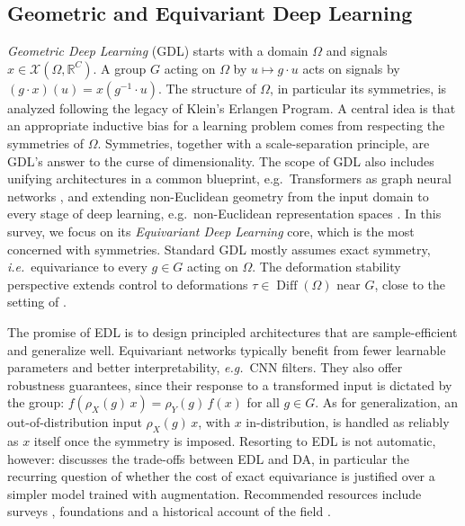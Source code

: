 \documentclass[mathematics,review,submit,moreauthors]{Definitions/mdpi}
\begin{document}
\subsection{Geometric and Equivariant Deep Learning}\label{sec:gdl}
\emph{Geometric Deep Learning} (GDL) \citep{bronstein2017ispm,bronstein2021} starts with a domain $\Omega$ and signals $x\in\mathcal{X}(\Omega,\mathbb{R}^C)$. A group $G$ acting on $\Omega$ by $u\mapsto g\cdot u$ acts on signals by $(g\cdot x)(u)=x(g^{-1}\cdot u)$.
The structure of $\Omega$, in particular its symmetries, is analyzed following the legacy of Klein's Erlangen Program.
A central idea is that an appropriate inductive bias for a learning problem comes from respecting the symmetries of $\Omega$.
Symmetries, together with a scale-separation principle, are GDL's answer to the curse of dimensionality.
The scope of GDL also includes unifying architectures in a common blueprint, e.g.\ Transformers as graph neural networks \citep{joshi2025}, and extending non-Euclidean geometry from the input domain to every stage of deep learning, e.g.\ non-Euclidean representation spaces \citep{mettes2024ijcv,saezdeocarizborde2025iclr}.
In this survey, we focus on its \emph{Equivariant Deep Learning} core, which is the most concerned with symmetries.
Standard GDL mostly assumes exact symmetry, \textit{i.e.}\ equivariance to every $g\in G$ acting on $\Omega$.
The deformation stability perspective \citep[Sec.~3.3]{bronstein2021} extends control to deformations $\tau\in\operatorname{Diff}(\Omega)$ near $G$, close to the setting of .

The promise of EDL is to design principled architectures that are sample-efficient and generalize well.
Equivariant networks typically benefit from fewer learnable parameters and better interpretability, \textit{e.g.}\ CNN filters.
They also offer robustness guarantees, since their response to a transformed input is dictated by the group: $f(\rho_X(g)\,x)=\rho_Y(g)\,f(x)$ for all $g\in G$.
As for generalization, an out-of-distribution input $\rho_X(g)\,x$, with $x$ in-distribution, is handled as reliably as $x$ itself once the symmetry is imposed.
Resorting to EDL is not automatic, however:  discusses the trade-offs between EDL and DA, in particular the recurring question of whether the cost of exact equivariance is justified over a simpler model trained with augmentation.
Recommended resources include surveys \citep{rath2024air,basheer2025ijdsa}, foundations \citep{borde2025,gerken2021,carlsson2025} and a historical account of the field \citep{bronstein2023tg}.
\end{document}
